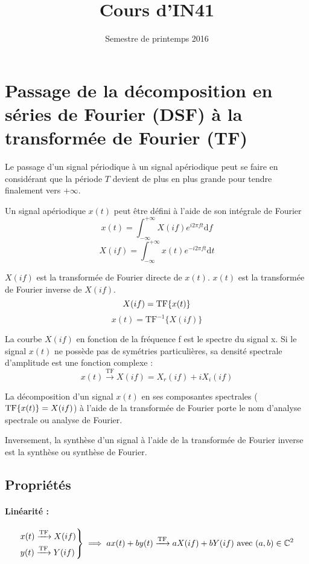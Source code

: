 \documentclass[a4paper,12pt]{article}
\title{Cours d'IN41}{Chapitre 3 -- Analyse des signaux apériodiques}
\author{}
\date{Semestre de printemps 2016}
\begin{document}
\maketitlepage

\tableofcontents
\pagebreak

\section{Passage de la décomposition en séries de Fourier (DSF) à la transformée de Fourier (TF)}

Le passage d'un signal périodique à un signal apériodique peut se faire en considérant que la période $T$ devient de plus en plus grande pour tendre finalement vers $+\infty$.

\begin{defi}
    Un signal apériodique $x(t)$ peut être défini à l'aide de son intégrale de Fourier
    \[ x(t) = \int_{-\infty}^{+\infty} X(if) e^{i2\pi ft} \mathrm{d}f \]
    \[ X(if) = \int_{-\infty}^{+\infty} x(t) e^{-i2\pi ft} \mathrm{d}t \]

    $X(if)$ est la transformée de Fourier directe de $x(t)$. $x(t)$ est la transformée de Fourier inverse de $X(if)$.
    \[ X(if) = \mathrm{TF} \{ x(t) \} \]
    \[ x(t) = \mathrm{TF}^{-1} \{X(if)\} \]
\end{defi}

La courbe $X(if)$ en fonction de la fréquence f est le spectre du signal x. Si le signal $x(t)$ ne possède pas de symétries particulières, sa densité spectrale d'amplitude est une fonction complexe :
\[ x(t) \xrightarrow{\mathrm{TF}} X(if) = X_r(if) + iX_i(if) \]

La décomposition d'un signal $x(t)$ en ses composantes spectrales ($\mathrm{TF} \{ x(t) \} = X(if)$) à l'aide de la transformée de Fourier porte le nom d'analyse spectrale ou analyse de Fourier.

Inversement, la synthèse d'un signal à l'aide de la transformée de Fourier inverse est la synthèse ou synthèse de Fourier.

\subsection{Propriétés}

\paragraph{Linéarité :}

\[
\begin{rcases}
    x(t) \xrightarrow{\mathrm{TF}} X(if) \\
    y(t) \xrightarrow{\mathrm{TF}} Y(if)
\end{rcases} \implies ax(t) + by(t) \xrightarrow{\mathrm{TF}} aX(if) + bY(if) \text{ avec } (a,b) \in \mathbb{C}^2\]
\end{document}

